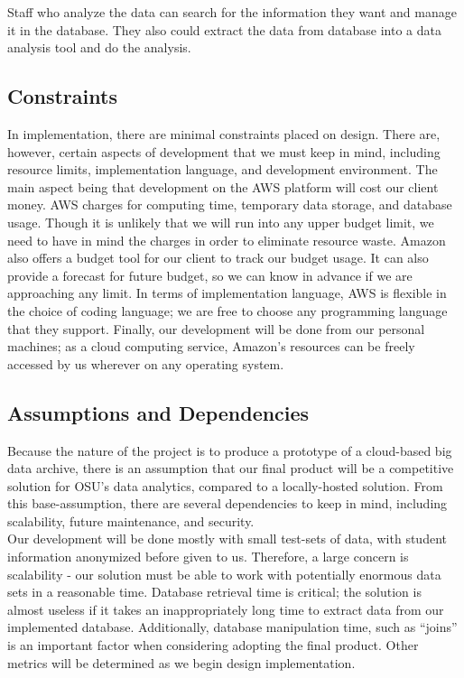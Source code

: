 \documentclass[letterpaper,10pt]{article}
\begin{document}
        \noindent Staff who analyze the data can search for the information they want and manage it in the database. They also could extract the data from database into a data analysis tool and do the analysis.

        \subsection{Constraints}
        In implementation, there are minimal constraints placed on design. There are, however, certain aspects of development that we must keep in mind, including resource limits, implementation language, and development environment. The main aspect being that development on the AWS platform will cost our client money. AWS charges for computing time, temporary data storage, and database usage. Though it is unlikely that we will run into any upper budget limit, we need to have in mind the charges in order to eliminate resource waste. Amazon also offers a budget tool for our client to track our budget usage. It can also provide a forecast for future budget, so we can know in advance if we are approaching any limit. In terms of implementation language, AWS is flexible in the choice of coding language; we are free to choose any programming language that they support. Finally, our development will be done from our personal machines; as a cloud computing service, Amazon’s resources can be freely accessed by us wherever on any operating system.

        \subsection{Assumptions and Dependencies}
        Because the nature of the project is to produce a prototype of a cloud-based big data archive, there is an assumption that our final product will be a competitive solution for OSU’s data analytics, compared to a locally-hosted solution. From this base-assumption, there are several dependencies to keep in mind, including scalability, future maintenance, and security.\\
        
        \noindent Our development will be done mostly with small test-sets of data, with student information anonymized before given to us. Therefore, a large concern is scalability - our solution must be able to work with potentially enormous data sets in a reasonable time. Database retrieval time is critical; the solution is almost useless if it takes an inappropriately long time to extract data from our implemented database. Additionally, database manipulation time, such as “joins” is an important factor when considering adopting the final product. Other metrics will be determined as we begin design implementation.\\
        
\end{document}
